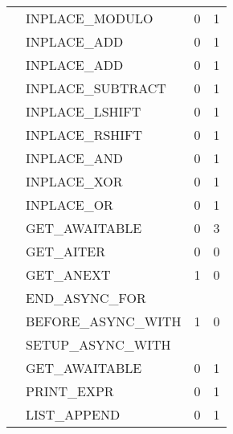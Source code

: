 \begin{longtable}{|p{4cm}|p{4cm}|p{2cm}|p{2cm}|  }
     & 
    INPLACE\_MODULO&0&1\\

     & 
    INPLACE\_ADD&0&1\\
    
     & 
    INPLACE\_ADD&0&1\\

     & 
    INPLACE\_SUBTRACT&0&1\\

     & 
    INPLACE\_LSHIFT&0&1\\

     & 
    INPLACE\_RSHIFT&0&1\\

     & 
    INPLACE\_AND&0&1\\

     & 
    INPLACE\_XOR&0&1\\

     & 
    INPLACE\_OR&0&1\\

    \hline


     & GET\_AWAITABLE&0&3\\
    
     & 
    GET\_AITER&0&0\\

     & 
    GET\_ANEXT&1&0\\

     & 
    END\_ASYNC\_FOR&&\\

     & 
    BEFORE\_ASYNC\_WITH&1&0\\
    
     & 
    SETUP\_ASYNC\_WITH&&\\

    \hline

     & GET\_AWAITABLE&0&1\\
    
     & 

    PRINT\_EXPR&0&1\\
    
     & 

    LIST\_APPEND&0&1\\


\end{longtable}
